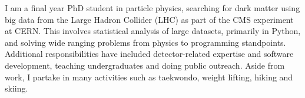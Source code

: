 
\begin{cvparagraph}
I am a final year PhD student in particle physics, searching for dark matter using big data from the Large Hadron Collider (LHC) as part of the CMS experiment at CERN. This involves statistical analysis of large datasets, primarily in Python, and solving wide ranging problems from physics to programming standpoints. Additional responsibilities have included detector-related expertise and software development, teaching undergraduates and doing public outreach. Aside from work, I partake in many activities such as taekwondo, weight lifting, hiking and skiing.
\end{cvparagraph}

